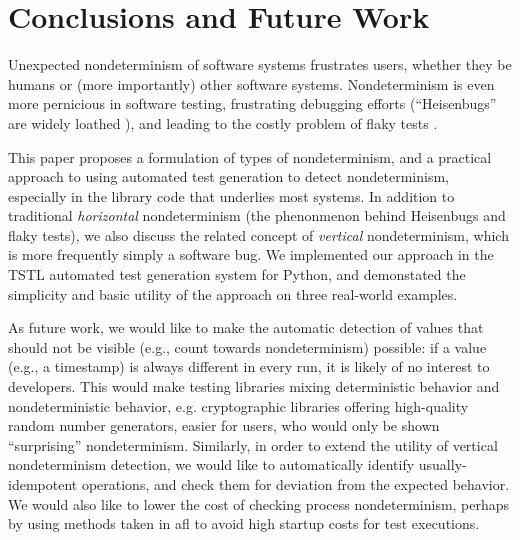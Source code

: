 \section{Conclusions and Future Work}

Unexpected nondeterminism of software systems frustrates users,
whether they be humans or (more importantly) other software systems.
Nondeterminism is even more pernicious in software testing,
frustrating debugging efforts (``Heisenbugs'' are widely loathed \cite{Heisenbug}), and
leading to the costly problem of flaky tests
\cite{miccoflaky,listfieldtestanalysis}.

This paper proposes a formulation of types of nondeterminism, and a
practical approach to using automated test generation to detect
nondeterminism, especially in the library code that underlies most
systems. In addition to traditional \emph{horizontal} nondeterminism
(the phenonmenon behind Heisenbugs and flaky tests), we also discuss
the related concept of \emph{vertical} nondeterminism, which is more
frequently simply a software bug.  We implemented our approach in the
TSTL automated test generation system for Python, and demonstated the
simplicity and basic utility of the approach on three real-world examples.

As future work, we would like to make the automatic detection of
values that should not be visible (e.g., count towards nondeterminism)
possible: if a value (e.g., a timestamp) is always different in every
run, it is likely of no interest to developers.  This would make
testing libraries mixing deterministic behavior and nondeterministic
behavior, e.g. cryptographic libraries offering high-quality random
number generators, easier for users, who would only be shown
``surprising'' nondeterminism.  Similarly, in order to extend the
utility of vertical nondeterminism detection, we would like to
automatically identify usually-idempotent operations, and check them
for deviation from the expected behavior.  We would also like to lower the cost
of checking process nondeterminism, perhaps by using methods taken in
afl \cite{aflfuzz} to avoid high startup costs for test executions.